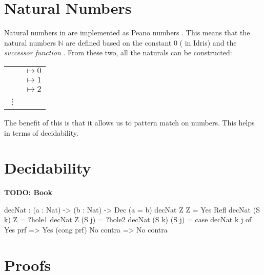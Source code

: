 \section{Natural Numbers}
	Natural numbers in \Idris are implemented as Peano numbers \cite{brady_2013}. This means that the natural numbers $\mathbb{N}$ are defined based on the constant 0 ( in Idris) and the \textit{successor function} . From these two, all the naturals can be constructed:
	\begin{tabular}{r l}
		\idrisinline{Z} & $\mapsto 0$ \\ 
		\idrisinline{S Z} & $\mapsto 1$ \\ 
		\idrisinline{S (S Z)} & $\mapsto 2$ \\ 
		\vdots & \\
	\end{tabular}
	\par
	The benefit of this is that it allows us to pattern match on numbers. This helps in terms of decidability.

\section{Decidability}
	\textbf{TODO: Book}
	\begin{code}
		decNat : (a : Nat) -> (b : Nat) -> Dec (a = b)
		decNat Z Z = Yes Refl
		decNat (S k) Z = ?hole1
		decNat Z (S j) = ?hole2
		decNat (S k) (S j) = case decNat k j of
													Yes prf => Yes (cong prf)
													No contra => No contra
	\end{code}

\section{Proofs}

